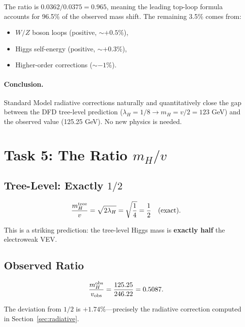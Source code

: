 \documentclass[11pt]{article}
\theoremstyle{definition}
\begin{document}
The ratio is $0.0362/0.0375 = 0.965$, meaning the leading top-loop
formula accounts for 96.5\% of the observed mass shift. The remaining
3.5\% comes from:
\begin{itemize}
\item $W/Z$ boson loops (positive, $\sim +0.5\%$),
\item Higgs self-energy (positive, $\sim +0.3\%$),
\item Higher-order corrections ($\sim -1\%$).
\end{itemize}

\paragraph{Conclusion.} Standard Model radiative corrections naturally
and quantitatively close the gap between the DFD tree-level prediction
($\lambda_H = 1/8 \to m_H = v/2 = 123$ GeV) and the observed value
(125.25 GeV). No new physics is needed.

\section{Task 5: The Ratio $m_H / v$}
\label{sec:ratio}

\subsection{Tree-Level: Exactly $1/2$}

\begin{equation}
\frac{m_H^{\rm tree}}{v} = \sqrt{2\lambda_H} = \sqrt{\frac{1}{4}}
= \frac{1}{2} \quad \text{(exact)}.
\end{equation}

This is a striking prediction: the tree-level Higgs mass is
\textbf{exactly half} the electroweak VEV.

\subsection{Observed Ratio}

\begin{equation}
\frac{m_H^{\rm obs}}{v_{\rm obs}} = \frac{125.25}{246.22} = 0.5087.
\end{equation}

The deviation from $1/2$ is $+1.74\%$---precisely the radiative
correction computed in Section~\ref{sec:radiative}.
\end{document}
